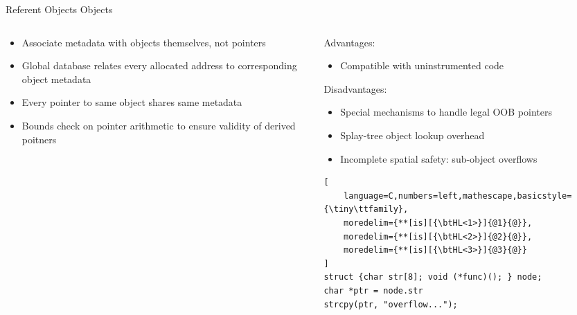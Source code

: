 \documentclass[aspectratio=169]{beamer}
\begin{document}
\begin{frame}[fragile]{Referent Objects}
Objects
\footnotesize
\begin{columns}[T]
\begin{column}{0.45\textwidth}
\begin{itemize}[<+->]
    \item Associate metadata with \alert{objects} themselves, not pointers
    \item Global database relates every allocated address to corresponding object metadata 
    \item Every pointer to same object shares same metadata
    \item Bounds check on \alert{pointer arithmetic} to ensure validity of derived poitners 
\end{itemize}
\end{column}

\pause

\begin{column}{0.45\textwidth}
Advantages:
\begin{itemize}
  \item Compatible with uninstrumented code 
\end{itemize}
\pause
Disadvantages:
\begin{itemize}
  \item Special mechanisms to handle legal OOB pointers 
  \item Splay-tree object lookup overhead
  \item Incomplete spatial safety: \alert{sub-object overflows} 
\end{itemize}
\pause

\begin{lstlisting}[
    language=C,numbers=left,mathescape,basicstyle={\tiny\ttfamily},
    moredelim={**[is][{\btHL<1>}]{@1}{@}},
    moredelim={**[is][{\btHL<2>}]{@2}{@}},
    moredelim={**[is][{\btHL<3>}]{@3}{@}}
]
struct {char str[8]; void (*func)(); } node;
char *ptr = node.str
strcpy(ptr, "overflow...");
\end{lstlisting}
\end{column}
\end{columns}

\end{frame}
\end{document}
